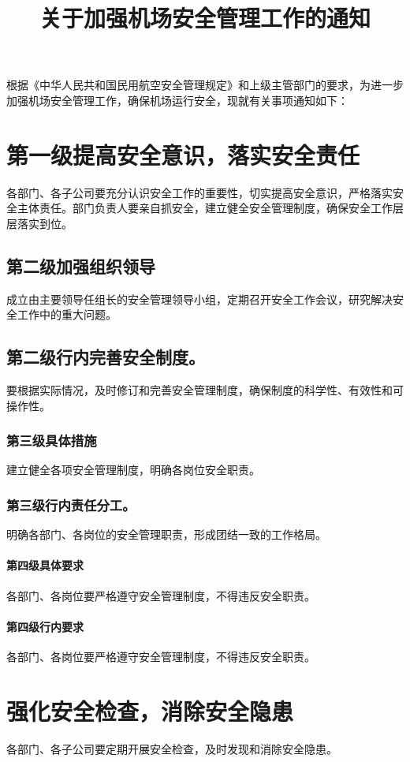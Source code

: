 \documentclass{common-doc}
\title{关于加强机场安全管理工作的通知}
\begin{document}
\maketitle

根据《中华人民共和国民用航空安全管理规定》和上级主管部门的要求，为进一步加强机场安全管理工作，确保机场运行安全，现就有关事项通知如下：

\section{第一级提高安全意识，落实安全责任}
各部门、各子公司要充分认识安全工作的重要性，切实提高安全意识，严格落实安全主体责任。部门负责人要亲自抓安全，建立健全安全管理制度，确保安全工作层层落实到位。

\subsection{第二级加强组织领导}
成立由主要领导任组长的安全管理领导小组，定期召开安全工作会议，研究解决安全工作中的重大问题。

\subsection*{第二级行内完善安全制度。}
要根据实际情况，及时修订和完善安全管理制度，确保制度的科学性、有效性和可操作性。

\subsubsection{第三级具体措施}
建立健全各项安全管理制度，明确各岗位安全职责。

\subsubsection*{第三级行内责任分工。}
明确各部门、各岗位的安全管理职责，形成团结一致的工作格局。

\paragraph{第四级具体要求}
各部门、各岗位要严格遵守安全管理制度，不得违反安全职责。

\paragraph*{第四级行内要求}
各部门、各岗位要严格遵守安全管理制度，不得违反安全职责。

\section{强化安全检查，消除安全隐患}
各部门、各子公司要定期开展安全检查，及时发现和消除安全隐患。
\end{document}
